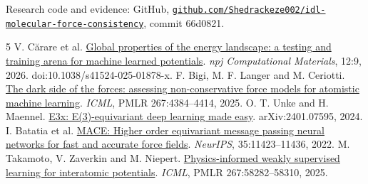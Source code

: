 \documentclass{article}
\begin{document}
{\raggedright Research code and evidence: GitHub, \href{https://github.com/Shedrackeze002/idl-molecular-force-consistency/tree/66d082158100a0c81b9a7815f7ac2a65f155b7ee}{\nolinkurl{github.com/Shedrackeze002/idl-molecular-force-consistency}}, commit 66d0821.\par}
\clearpage
\begin{thebibliography}{5}\small
{} V. C\u{a}rare et al. \href{https://doi.org/10.1038/s41524-025-01878-x}{Global properties of the energy landscape: a testing and training arena for machine learned potentials}. \emph{npj Computational Materials}, 12:9, 2026. doi:10.1038/s41524-025-01878-x.
 F. Bigi, M. F. Langer and M. Ceriotti. \href{https://proceedings.mlr.press/v267/bigi25a.html}{The dark side of the forces: assessing non-conservative force models for atomistic machine learning}. \emph{ICML}, PMLR 267:4384--4414, 2025.
 O. T. Unke and H. Maennel. \href{https://arxiv.org/abs/2401.07595}{E3x: E(3)-equivariant deep learning made easy}. arXiv:2401.07595, 2024.
 I. Batatia et al. \href{https://arxiv.org/abs/2206.07697}{MACE: Higher order equivariant message passing neural networks for fast and accurate force fields}. \emph{NeurIPS}, 35:11423--11436, 2022.
 M. Takamoto, V. Zaverkin and M. Niepert. \href{https://proceedings.mlr.press/v267/takamoto25a.html}{Physics-informed weakly supervised learning for interatomic potentials}. \emph{ICML}, PMLR 267:58282--58310, 2025.
\end{thebibliography}
\end{document}
